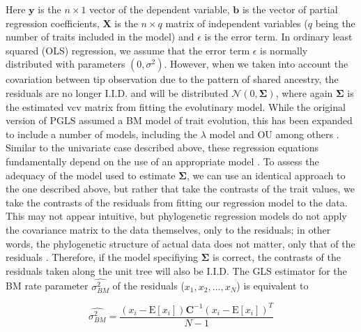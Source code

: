 \documentclass[12pt]{article}
\begin{document}
Here $\mathbf{y}$ is the $n \times 1$ vector of the dependent variable, $\mathbf{b}$ is the vector of partial regression coefficients, $\mathbf{X}$ is the $n \times q$ matrix of independent variables ($q$ being the number of traits included in the model) and $\epsilon$ is the error term. In ordinary least squared (OLS) regression, we assume that the error term $\epsilon$ is normally distributed with parameters $(0, \sigma^2)$. However, when we taken into account the covariation between tip observation due to the pattern of shared ancestry, the residuals are no longer I.I.D. and will be distributed $\mathcal{N} (0, \mathbf{\Sigma})$, where again $\mathbf{\Sigma}$ is the estimated vcv matrix from fitting the evolutinary model. While the original version of PGLS assumed a BM model of trait evolution, this has been expanded to include a number of models, including the $\lambda$ model \citep{Pagel1997, Freckleton2009, Revell2010} and OU \citep{Hansen2008, Labra2009, Bartoszek2012} among others \citep[see also][]{Lynch1991, Hadfield2010}. Similar to the univariate case described above, these regression equations fundamentally depend on the use of an appropriate model \citep{Hansen2012SysBio}. To assess the adequacy of the model used to estimate $\mathbf{\Sigma}$, we can use an identical approach to the one described above, but rather that take the contrasts of the trait values, we take the contrasts of the residuals from fitting our regression model to the data. This may not appear intuitive, but phylogenetic regression models do not apply the covariance matrix to the data themselves, only to the residuals; in other words, the phylogenetic structure of actual data does not matter, only that of the residuals \citep{Rohlf2001}. Therefore, if the model specifiying $\mathbf{\Sigma}$ is correct, the contrasts of the residuals taken along the unit tree will also be I.I.D. The GLS estimator for the  BM rate parameter $\hat{\sigma^2_{BM}}$ of the residuals ($x_1, x_2, \ldots , x_N$) is equivalent to

\begin{equation}
\hat{\sigma^2_{BM}} = \frac{(x_i - \mathrm{E}[x_i])\mathbf{C}^{-1}(x_i - \mathrm{E}[x_i])^{T}}{N-1} 
\end{equation}
\end{document}
